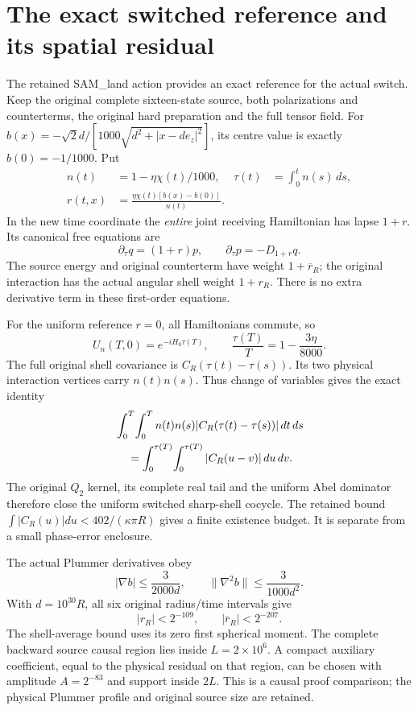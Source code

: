 \section{The exact switched reference and its spatial residual}
The retained SAM\_land action provides an exact reference for the actual
switch.  Keep the original complete sixteen-state source, both polarizations
and counterterms, the original hard preparation and the full tensor field.
For $b(x)=-\sqrt2d/[1000\sqrt{d^2+|x-de_z|^2}]$, its centre value is
exactly $b(0)=-1/1000$.  Put
\begin{align*}
 n(t)&=1-\eta\chi(t)/1000,&
 \tau(t)&=\int_0^t n(s)\,ds,\\
 r(t,x)&=\frac{\eta\chi(t)[b(x)-b(0)]}{n(t)}.
\end{align*}
In the new time coordinate the \emph{entire} joint receiving Hamiltonian has
lapse $1+r$.  Its canonical free equations are
\[
 \partial_\tau q=(1+r)p,\qquad
 \partial_\tau p=-D_{1+r}q.
\]
The source energy and original counterterm have weight $1+\overline r_R$;
the original interaction has the actual angular shell weight $1+r_R$.
There is no extra derivative term in these first-order equations.

For the uniform reference $r=0$, all Hamiltonians commute, so
\[
 U_n(T,0)=e^{-iH_0\tau(T)},\qquad
 \frac{\tau(T)}T=1-\frac{3\eta}{8000}.
\]
The full original shell covariance is $C_R(\tau(t)-\tau(s))$.  Its two
physical interaction vertices carry $n(t)n(s)$.  Thus change of variables
gives the exact identity
\begin{align*}
 &\int_0^T\!\int_0^T n(t)n(s)
       |C_R(\tau(t)-\tau(s))|\,dt\,ds\\
 &\hspace{4mm}=\int_0^{\tau(T)}\!\int_0^{\tau(T)}
                         |C_R(u-v)|\,du\,dv.
\end{align*}
The original $Q_2$ kernel, its complete real tail and the uniform Abel
dominator therefore close the uniform switched sharp-shell cocycle.  The
retained bound $\int|C_R(u)|du<402/(\kappa\pi R)$ gives a finite existence
budget.  It is separate from a small phase-error enclosure.

The actual Plummer derivatives obey
\[
 |\nabla b|\le\frac3{2000d},\qquad
 \|\nabla^2b\|\le\frac3{1000d^2}.
\]
With $d=10^{30}R$, all six original radius/time intervals give
\[
 |r_R|<2^{-109},\qquad |\overline r_R|<2^{-207}.
\]
The shell-average bound uses its zero first spherical moment.  The complete
backward source causal region lies inside $L=2\times10^6$.  A compact
auxiliary coefficient, equal to the physical residual on that region, can
be chosen with amplitude $A=2^{-83}$ and support inside $2L$.
This is a causal proof comparison; the physical Plummer profile and original
source size are retained.

